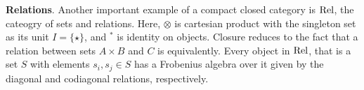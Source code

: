 
\medskip
\noindent
{\bf Relations}.
Another important example of a  compact closed category is
$\mathrm{Rel}$, the cateogry of sets and relations. Here, $\otimes$ is
cartesian product with the singleton set as its unit $I = \{\star\}$, and $^*$ is identity on objects. Closure reduces to the
fact that a relation between sets $A\times B$ and $C$ is equivalently. 
%
%
%
Every object in $\mathrm{Rel}$, that is a set $S$ with elements $s_i, s_j \in S$  has a
Frobenius algebra over it given by the diagonal and codiagonal
relations, respectively. 








